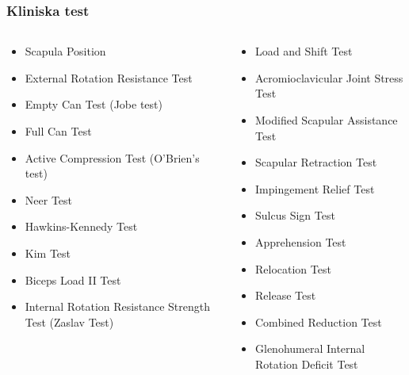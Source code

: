 \documentclass[aspectratio=169,12pt,handout,usenames,dvipsnames]{beamer}
\begin{document}
	\begin{frame}
		\frametitle{Kliniska test}

	
	\begin{columns}
		\begin{column}{0.5\textwidth}
			\begin{itemize}
					\item Scapula Position
					\item External Rotation Resistance Test
					\item Empty Can Test (Jobe test)
					\item Full Can Test
					\item Active Compression Test (O’Brien’s test)
					\item Neer Test
					\item Hawkins-Kennedy Test
					\item Kim Test
					\item Biceps Load II Test
					\item Internal Rotation Resistance Strength Test (Zaslav Test)
			\end{itemize}
		\end{column}
		\begin{column}{0.5\textwidth}
		\begin{itemize}
				\item Load and Shift Test
				\item Acromioclavicular Joint Stress Test
				\item Modified Scapular Assistance Test
				\item Scapular Retraction Test
				\item Impingement Relief Test
				\item Sulcus Sign Test
				\item Apprehension Test
				\item Relocation Test
				\item Release Test
				\item Combined Reduction Test
				\item Glenohumeral Internal Rotation Deficit Test
		\end{itemize}
\end{column}
	\end{columns}
	\end{frame}
\end{document}
